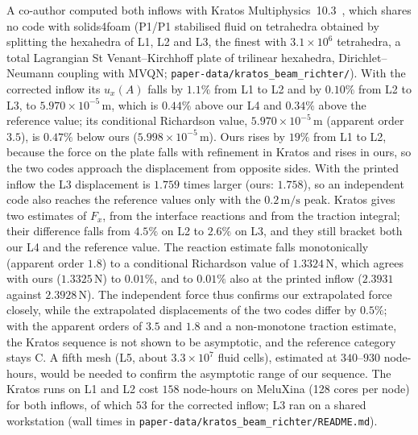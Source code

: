 \documentclass[sn-mathphys,Numbered]{sn-jnl}%
\renewcommand\paragraph[1]{\par\addvspace{1.2ex plus .4ex minus .2ex}%
	\noindent{\normalfont\bfseries #1}\hspace{0.5em}\ignorespaces}
\begin{document}
\begin{appendices}
\paragraph{An independent solution.}
A co-author computed both inflows with Kratos Multiphysics~10.3~\citep{Dadvand2010}, which shares no code with solids4foam (P1/P1 stabilised fluid on tetrahedra obtained by splitting the hexahedra of L1, L2 and L3, the finest with $3.1\times10^{6}$ tetrahedra, a total Lagrangian St Venant--Kirchhoff plate of trilinear hexahedra, Dirichlet--Neumann coupling with MVQN; \texttt{paper-data/kratos\_beam\_richter/}).
With the corrected inflow its $u_x(A)$ falls by $1.1\%$ from L1 to L2 and by $0.10\%$ from L2 to L3, to $5.970\times10^{-5}\,\mathrm{m}$, which is $0.44\%$ above our L4 and $0.34\%$ above the reference value; its conditional Richardson value, $5.970\times10^{-5}\,\mathrm{m}$ (apparent order $3.5$), is $0.47\%$ below ours ($5.998\times10^{-5}\,\mathrm{m}$).
Ours rises by $19\%$ from L1 to L2, because the force on the plate falls with refinement in Kratos and rises in ours, so the two codes approach the displacement from opposite sides.
With the printed inflow the L3 displacement is $1.759$ times larger (ours: $1.758$), so an independent code also reaches the reference values only with the $0.2\,\mathrm{m/s}$ peak.
Kratos gives two estimates of $F_x$, from the interface reactions and from the traction integral; their difference falls from $4.5\%$ on L2 to $2.6\%$ on L3, and they still bracket both our L4 and the reference value.
The reaction estimate falls monotonically (apparent order $1.8$) to a conditional Richardson value of $1.3324\,\mathrm{N}$, which agrees with ours ($1.3325\,\mathrm{N}$) to $0.01\%$, and to $0.01\%$ also at the printed inflow ($2.3931$ against $2.3928\,\mathrm{N}$).
The independent force thus confirms our extrapolated force closely, while the extrapolated displacements of the two codes differ by $0.5\%$; with the apparent orders of $3.5$ and $1.8$ and a non-monotone traction estimate, the Kratos sequence is not shown to be asymptotic, and the reference category stays C.
A fifth mesh (L5, about $3.3\times10^{7}$ fluid cells), estimated at $340$--$930$ node-hours, would be needed to confirm the asymptotic range of our sequence.
The Kratos runs on L1 and L2 cost $158$ node-hours on MeluXina (128 cores per node) for both inflows, of which $53$ for the corrected inflow; L3 ran on a shared workstation (wall times in \texttt{paper-data/kratos\_beam\_richter/README.md}).






\end{appendices}
\end{document}
